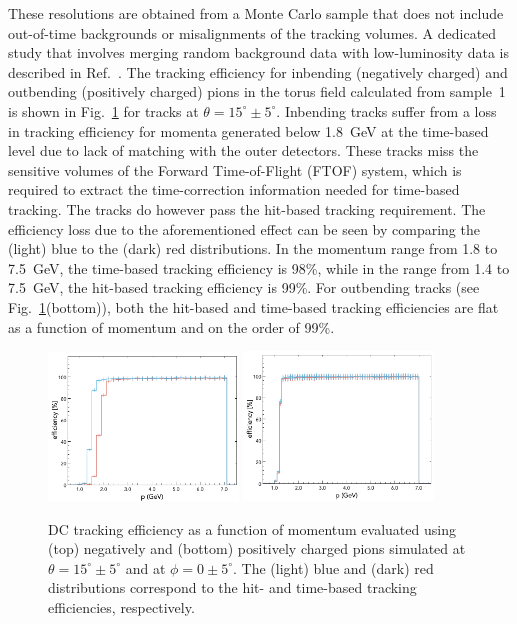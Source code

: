 These resolutions are obtained from a Monte Carlo sample that does not include out-of-time backgrounds or
misalignments of the tracking volumes. A dedicated study that involves merging random background data with
low-luminosity data is described in Ref.~\cite{clas12-nim}.
{\color{red}
The tracking efficiency for inbending (negatively charged) and outbending (positively charged) pions in the torus 
field calculated from sample~1 is shown in Fig.~\ref{fig:trkeff} for tracks at $\theta =15^\circ \pm 5^\circ$. }
Inbending tracks suffer from a loss in tracking 
efficiency for momenta generated below
1.8~GeV at the time-based level due to lack of matching with the outer detectors. These tracks miss the sensitive
volumes of the Forward Time-of-Flight (FTOF) system, which is required to extract the time-correction information
needed for time-based tracking. The tracks do however pass the hit-based tracking requirement. The efficiency
loss due to the aforementioned effect can be seen by comparing the (light) blue to the (dark) red distributions. In
the momentum range from 1.8 to 7.5~GeV, the time-based tracking efficiency is 98\%, while in the range from
1.4 to 7.5~GeV, the hit-based tracking efficiency is 99\%. For outbending tracks (see Fig.~\ref{fig:trkeff}(bottom)),
both the hit-based and time-based tracking efficiencies are flat as a function of momentum and on the order of 99\%. 

\begin{figure}[t]
\includegraphics[width=0.45\textwidth]{pics/DCTrkgEffNegTrks.png}
\includegraphics[width=0.45\textwidth]{pics/DCTrkgEffPosTrks.png}
\caption{DC tracking efficiency as a function of momentum evaluated using (top) negatively and (bottom) positively
  charged pions simulated at $\theta =15^\circ \pm 5^\circ$ and at $\phi = 0 \pm 5^\circ$. The (light) blue and (dark)
  red distributions correspond to the hit- and time-based tracking efficiencies, respectively.}
\label{fig:trkeff}
\end{figure}

